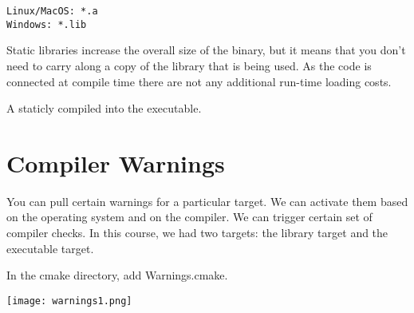 \documentclass[openany]{report}
\begin{document}
\begin{verbatim}
Linux/MacOS: *.a
Windows: *.lib
\end{verbatim}

Static libraries increase the overall size of the binary, but it means that you don't need to carry along a copy of the library that is being used.
As the code is connected at compile time there are not any additional run-time loading costs.

A staticly compiled into the executable.


\section{Compiler Warnings}

You can pull certain warnings for a particular target.
We can activate them based on the operating system and on the compiler.
We can trigger certain set of compiler checks.
In this course, we had two targets: the library target and the executable target.

In the cmake directory, add Warnings.cmake. 

\begin{center}
    \texttt{[image: warnings1.png]}
\end{center}
\end{document}
